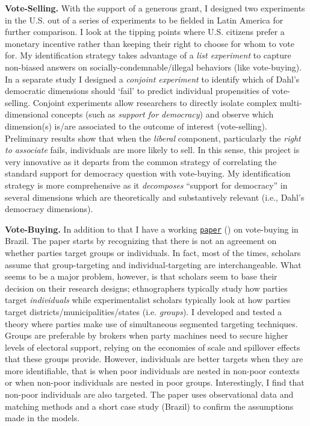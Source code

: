 {\bf Vote-Selling.} With the support of a generous grant, I designed two experiments in the U.S. out of a series of experiments to be fielded in Latin America for further comparison. I look at the tipping points where U.S. citizens prefer a monetary incentive rather than keeping their right to choose for whom to vote for. My identification strategy takes advantage of a \emph{list experiment} to capture non-biased answers on socially-condemnable/illegal behaviors (like vote-buying). In a separate study I designed a \emph{conjoint experiment} to identify which of Dahl's democratic dimensions should `fail' to predict individual propensities of vote-selling. Conjoint experiments allow researchers to directly isolate complex multi-dimensional concepts (such as \emph{support for democracy}) and observe which dimension(s) is/are associated to the outcome of interest (vote-selling). Preliminary results show that when the \emph{liberal} component, particularly the \emph{right to associate} fails, individuals are more likely to sell. In this sense, this project is very innovative as it departs from the common strategy of correlating the standard support for democracy question with vote-buying. My identification strategy is more comprehensive as it \emph{decomposes} ``support for democracy'' in several dimensions which are theoretically and substantively relevant (i.e., Dahl's democracy dimensions). 

{\bf Vote-Buying.} In addition to that I have a working \href{https://github.com/hbahamonde/Clientelism_paper/raw/master/Bahamonde_Clientelism_Paper.pdf}{\texttt{paper}} (\emph{\unskip}) on vote-buying in Brazil. The paper starts by recognizing that there is not an agreement on whether parties target groups or individuals. In fact, most of the times, scholars assume that group-targeting and individual-targeting are interchangeable. What seems to be a major problem, however, is that scholars seem to base their decision on their research designs; ethnographers typically study how parties target \emph{individuals} while experimentalist scholars typically look at how parties target districts/municipalities/states (i.e. \emph{groups}). I developed and tested a theory where parties make use of simultaneous segmented targeting techniques. Groups are preferable by brokers when party machines need to secure higher levels of electoral support, relying on the economies of scale and spillover effects that these groups provide. However, individuals are better targets when they are more identifiable, that is when poor individuals are nested in non-poor contexts or when non-poor individuals are nested in poor groups. Interestingly, I find that non-poor individuals are also targeted. The paper uses observational data and matching methods and a short case study (Brazil) to confirm the assumptions made in the models.

